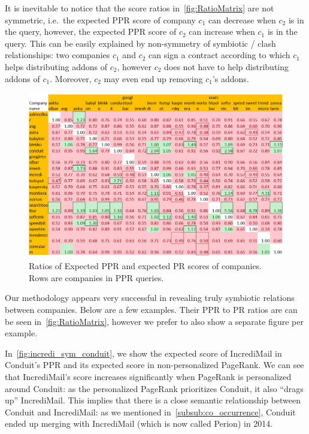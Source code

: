 \documentclass[ijoc,nonblindrev]{informs3} %
\numberwithin{equation}{subsection}
\begin{document}
It is inevitable to notice that the score ratios in~\autoref{fig:RatioMatrix} are not symmetric, i.e.~the expected PPR score of company $c_1$ can decrease when $c_2$ is in the query, however, the expected PPR score of $c_2$ can increase when $c_1$ is in the query. This can be easily explained by non-symmetry of symbiotic / clash relationships: two companies $c_1$ and $c_2$ can sign a contract according to which $c_1$ helps distributing addons of $c_2$, however $c_2$ does not have to help distributing addons of $c_1$. Moreover, $c_2$ may even end up removing $c_1$'s addons. 

\begin{figure}[!htbp]
\centering
    \includegraphics[scale=0.8]{figures/RatioMatrixPortrate.png}
    \caption{Ratios of Expected PPR and expected PR scores of companies. Rows are companies in PPR queries.}
    \label{fig:RatioMatrix}
\end{figure}

Our methodology appears very successful in revealing truly symbiotic relations between companies. Below are a few examples. Their PPR to PR ratios are can be seen in~\autoref{fig:RatioMatrix}, however we prefer to also show a separate figure per example.

In~\autoref{fig:incredi_sym_conduit}, we show the expected score of IncrediMail in Conduit's PPR and its expected score in non-personalized PageRank. We can see that IncrediMail's score increases significantly when PageRank is personalized around Conduit: as the personalized PageRank prioritizes Conduit, it also ``drags up'' IncrediMail. This implies that there is a close semantic relationship between Conduit and IncrediMail: as we mentioned in~\autoref{subsub:co_occurrence}, Conduit ended up merging with IncrediMail (which is now called Perion) in 2014. 
\end{document}
